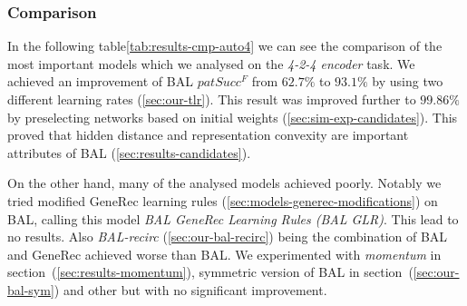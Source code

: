 
\subsubsection{Comparison} 
\label{sec:tlr-auto4-cmp} 

In the following table\ref{tab:results-cmp-auto4} we can see the comparison of the most important models which we analysed on the \emph{4-2-4 encoder} task. We achieved an improvement of BAL $patSucc^F$ from $62.7\%$ to $93.1\%$ by using two different learning rates (\ref{sec:our-tlr}). This result was improved further to $99.86\%$ by preselecting networks based on initial weights (\ref{sec:sim-exp-candidates}). This proved that hidden distance and representation convexity are important attributes of BAL (\ref{sec:results-candidates}). 

On the other hand, many of the analysed models achieved poorly. Notably we tried modified GeneRec learning rules (\ref{sec:models-generec-modifications}) on BAL, calling this model \emph{BAL GeneRec Learning Rules (BAL GLR)}. This lead to no results. Also \emph{BAL-recirc} (\ref{sec:our-bal-recirc}) being the combination of BAL and GeneRec achieved worse than BAL. We experimented with \emph{momentum} in section~(\ref{sec:results-momentum}), symmetric version of BAL in section~(\ref{sec:our-bal-sym}) and other but with no significant improvement. 

